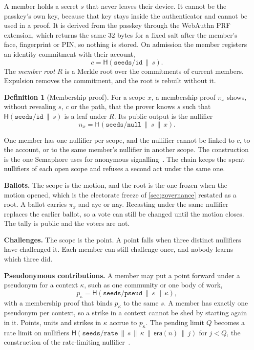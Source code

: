 \documentclass[11pt,a4paper]{article}
\theoremstyle{definition}
\newtheorem{definition}{Definition}[section]
\theoremstyle{plain}
\theoremstyle{remark}
\newcommand{\hash}{\mathsf{H}}
\newcommand{\era}{\mathsf{era}}
\begin{document}
A member holds a secret $s$ that never leaves their device. It cannot be the passkey's own key, because that key stays inside the authenticator and cannot be used in a proof. It is derived from the passkey through the WebAuthn PRF extension, which returns the same 32 bytes for a fixed salt after the member's face, fingerprint or PIN, so nothing is stored. On admission the member registers an identity commitment with their account,
\[
  c = \hash(\texttt{seeds/id} \,\|\, s).
\]
The \emph{member root} $R$ is a Merkle root over the commitments of current members. Expulsion removes the commitment, and the root is rebuilt without it.

\begin{definition}[Membership proof]
For a scope $x$, a membership proof $\pi_x$ shows, without revealing $s$, $c$ or the path, that the prover knows $s$ such that $\hash(\texttt{seeds/id} \,\|\, s)$ is a leaf under $R$. Its public output is the nullifier
\[
  n_x = \hash(\texttt{seeds/null} \,\|\, s \,\|\, x).
\]
\end{definition}

One member has one nullifier per scope, and the nullifier cannot be linked to $c$, to the account, or to the same member's nullifier in another scope. The construction is the one Semaphore uses for anonymous signalling~\cite{semaphore}. The chain keeps the spent nullifiers of each open scope and refuses a second act under the same one.

\textbf{Ballots.} The scope is the motion, and the root is the one frozen when the motion opened, which is the electorate freeze of \cref{sec:governance} restated as a root. A ballot carries $\pi_x$ and aye or nay. Recasting under the same nullifier replaces the earlier ballot, so a vote can still be changed until the motion closes. The tally is public and the voters are not.

\textbf{Challenges.} The scope is the point. A point falls when three distinct nullifiers have challenged it. Each member can still challenge once, and nobody learns which three did.

\textbf{Pseudonymous contributions.} A member may put a point forward under a pseudonym for a context $\kappa$, such as one community or one body of work,
\[
  p_\kappa = \hash(\texttt{seeds/pseud} \,\|\, s \,\|\, \kappa),
\]
with a membership proof that binds $p_\kappa$ to the same $s$. A member has exactly one pseudonym per context, so a strike in a context cannot be shed by starting again in it. Points, units and strikes in $\kappa$ accrue to $p_\kappa$. The pending limit $Q$ becomes a rate limit on nullifiers $\hash(\texttt{seeds/rate} \,\|\, s \,\|\, \kappa \,\|\, \era(n) \,\|\, j)$ for $j < Q$, the construction of the rate-limiting nullifier~\cite{rln}.
\end{document}
